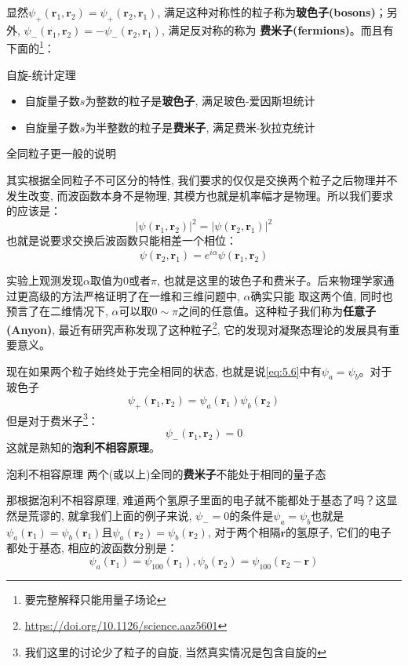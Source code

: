 \documentclass[a4paper,zihao=-4,linespread=1]{ctexrep}
\begin{document}
    显然$\psi_+(\mathbf{r}_1,\mathbf{r}_2)=\psi_+(\mathbf{r}_2,\mathbf{r}_1)$, 满足这种对称性的粒子称为\textbf{玻色子(bosons)}；另外, $\psi_-(\mathbf{r}_1,\mathbf{r}_2)=-\psi_-(\mathbf{r}_2,\mathbf{r}_1)$, 满足反对称的称为
    \textbf{费米子(fermions)}。而且有下面的\footnote{要完整解释只能用量子场论}：
    \begin{theorem}{自旋-统计定理}
        \begin{itemize}
            \item 自旋量子数$s$为整数的粒子是\textbf{玻色子}, 满足玻色-爱因斯坦统计
            \item 自旋量子数$s$为半整数的粒子是\textbf{费米子}, 满足费米-狄拉克统计
        \end{itemize}
    \end{theorem}
    \begin{history}{全同粒子更一般的说明}

        其实根据全同粒子不可区分的特性, 我们要求的仅仅是交换两个粒子之后物理并不发生改变, 而波函数本身不是物理, 其模方也就是机率幅才是物理。所以我们要求的应该是：
        \[\left|\psi(\mathbf{r}_1,\mathbf{r}_2)\right|^2=\left|\psi(\mathbf{r}_2,\mathbf{r}_1)\right|^2\]
        也就是说要求交换后波函数只能相差一个相位：
        \[\psi(\mathbf{r}_2,\mathbf{r}_1)=e^{i\alpha}\psi(\mathbf{r}_1,\mathbf{r}_2)\]

        \setlength\parindent{2em}实验上观测发现$\alpha$取值为$0$或者$\pi$, 也就是这里的玻色子和费米子。后来物理学家通过更高级的方法严格证明了在一维和三维问题中, $\alpha$确实只能
        取这两个值, 同时也预言了在二维情况下, $\alpha$可以取$0\sim\pi$之间的任意值。这种粒子我们称为\textbf{任意子(Anyon)}, 最近有研究声称发现了这种粒子\footnote{\href{https://doi.org/10.1126/science.aaz5601}{https://doi.org/10.1126/science.aaz5601}},
        它的发现对凝聚态理论的发展具有重要意义。
    \end{history}

    现在如果两个粒子始终处于完全相同的状态, 也就是说\ref{eq:5.6}中有$\psi_a=\psi_b$。对于玻色子
    \[\psi_+(\mathbf{r}_1,\mathbf{r}_2)=\psi_a(\mathbf{r}_1)\psi_b(\mathbf{r}_2)\]
    但是对于费米子\footnote{我们这里的讨论少了粒子的自旋, 当然真实情况是包含自旋的}：
    \[\psi_-(\mathbf{r}_1,\mathbf{r}_2)=0\]
    这就是熟知的\textbf{泡利不相容原理}。
    \begin{theorem}{泡利不相容原理}
        两个(或以上)全同的\textbf{费米子}不能处于相同的量子态
    \end{theorem}
    那根据泡利不相容原理, 难道两个氢原子里面的电子就不能都处于基态了吗？这显然是荒谬的, 就拿我们上面的例子来说, $\psi_-=0$的条件是$\psi_a=\psi_b$也就是
    $\psi_a(\mathbf{r}_1)=\psi_b(\mathbf{r}_1)$且$\psi_a(\mathbf{r}_2)=\psi_b(\mathbf{r}_2)$, 对于两个相隔$\mathbf{r}$的氢原子, 它们的电子都处于基态, 相应的波函数分别是：
    \[\psi_a(\mathbf{r}_1)=\psi_{100}(\mathbf{r}_1), \psi_b(\mathbf{r}_2)=\psi_{100}(\mathbf{r}_2-\mathbf{r})\]
    
\end{document}

